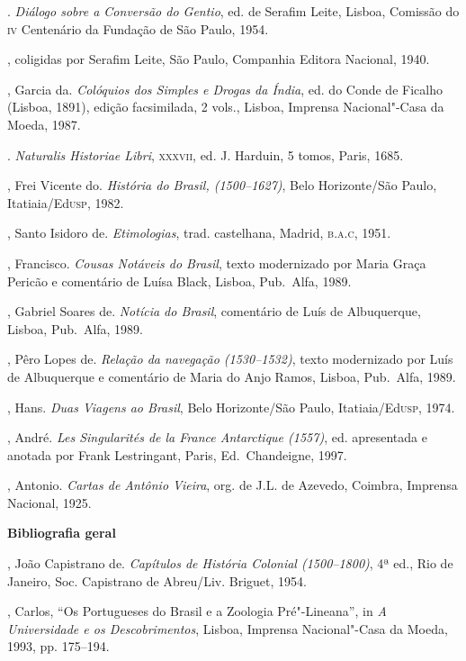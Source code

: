 \begin{bibliohedra}
\titidem. \textit{Diálogo sobre a Conversão do Gentio}, ed.
de Serafim Leite, Lisboa, Comissão do \textsc{iv} Centenário da Fundação de São Paulo, 1954.

, coligidas por
Serafim Leite, São Paulo, Companhia Editora Nacional, 1940.

, Garcia da. \textit{Colóquios dos Simples e Drogas da Índia}, ed.
do Conde de Ficalho (Lisboa, 1891), edição facsimilada, 2
vols., Lisboa, Imprensa Nacional"-Casa da Moeda, 1987.

. \textit{Naturalis Historiae Libri}, \textsc{xxxvii}, ed. J. Harduin, 5
tomos, Paris, 1685.

, Frei Vicente do. \textit{História do Brasil, (1500--1627)}, 
Belo Horizonte/São Paulo, Itatiaia/Ed\textsc{usp}, 1982.

, Santo Isidoro de. \textit{Etimologias}, trad. castelhana,
Madrid, \textsc{b.a.c}, 1951.

, Francisco. \textit{Cousas Notáveis do Brasil}, texto
modernizado por Maria Graça Pericão e comentário de Luísa Black,
Lisboa, Pub.~Alfa, 1989.

, Gabriel Soares de. \textit{Notícia do Brasil}, comentário de
Luís de Albuquerque, Lisboa, Pub.~Alfa, 1989.

, Pêro Lopes de. \textit{Relação da navegação (1530--1532)}, texto
modernizado por Luís de Albuquerque e comentário de Maria do Anjo
Ramos, Lisboa, Pub.~Alfa, 1989.

, Hans. \textit{Duas Viagens ao Brasil}, Belo Horizonte/São
Paulo, Itatiaia/Ed\textsc{usp}, 1974.

, André. \textit{Les Singularités de la France Antarctique
(1557)}, ed. apresentada e anotada por Frank Lestringant, Paris, Ed.~Chandeigne, 1997.

, Antonio. \textit{Cartas de Antônio Vieira}, org. de J.L. de
Azevedo, Coimbra, Imprensa Nacional, 1925.

\vspace*{2ex}
\scriptsize\textbf{Bibliografia geral}


, João Capistrano de. \textit{Capítulos de História Colonial
(1500--1800)}, 4ª ed., Rio de Janeiro, Soc. Capistrano de Abreu/Liv.
Briguet, 1954.

, Carlos, ``Os Portugueses do Brasil e a Zoologia Pré"-Lineana'', in
\textit{A Universidade e os Descobrimentos}, Lisboa, Imprensa
Nacional"-Casa da Moeda, 1993, pp. 175--194.


\end{bibliohedra}
